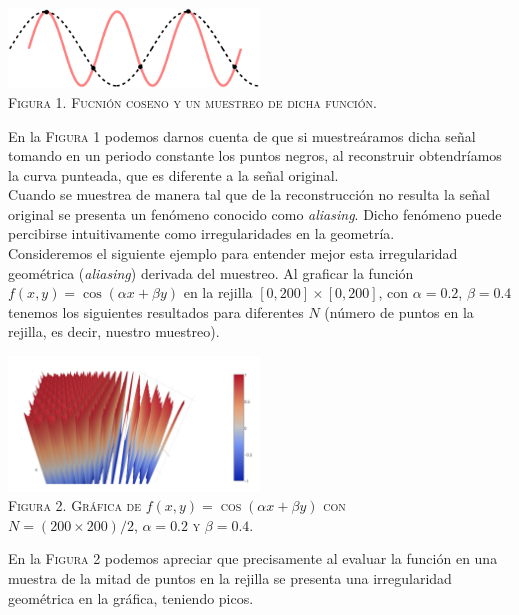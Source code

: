 \documentclass[a4paper]{article}
\begin{document}
\begin{center}
\includegraphics[width=0.5\textwidth]{curve1}\\
\textsc{Figura 1. Fucnión coseno y un muestreo de dicha función.}
\end{center}

\noindent En la \textsc{Figura 1} podemos darnos cuenta de que si muestreáramos dicha señal tomando en un periodo constante los puntos negros, al reconstruir obtendríamos la curva punteada, que es diferente a la señal original.\\

\noindent Cuando se muestrea de manera tal que de la reconstrucción no resulta la señal original se presenta un fenómeno conocido como \textit{aliasing}. Dicho fenómeno puede percibirse intuitivamente como irregularidades en la geometría.\\

\noindent Consideremos el siguiente ejemplo para entender mejor esta irregularidad geométrica (\textit{aliasing}) derivada del muestreo. Al graficar la función $f(x, y) = \cos(\alpha x + \beta y)$ en la rejilla $[0,200]\times[0,200]$, con $\alpha = 0.2$, $\beta = 0.4$ tenemos los siguientes resultados para diferentes $N$ (número de puntos en la rejilla, es decir, nuestro muestreo).\\

\begin{center}
\includegraphics[width=0.5\textwidth]{g1}\\
\textsc{Figura 2. Gráfica de $f(x, y) = \cos(\alpha x + \beta y)$ con \\$N = (200\times 200)/2$, $\alpha = 0.2$ y $\beta = 0.4$.}
\end{center}
En la \textsc{Figura 2} podemos apreciar que precisamente al evaluar la función en una muestra de la mitad de puntos en la rejilla se presenta una irregularidad geométrica en la gráfica, teniendo picos.\\
\end{document}
